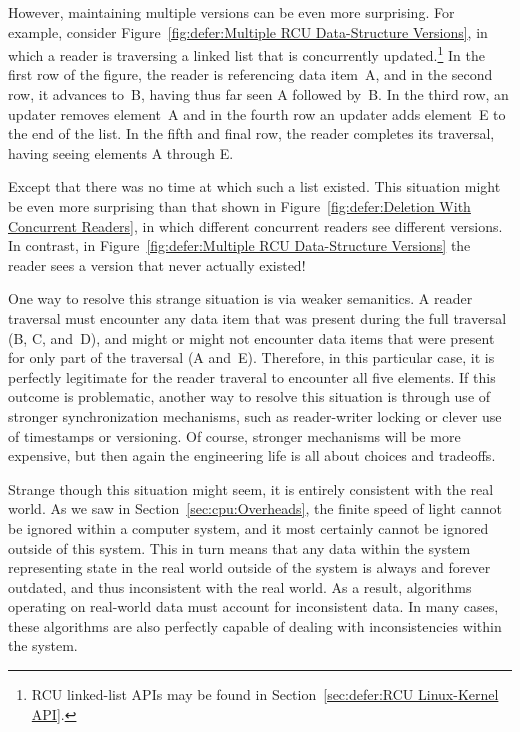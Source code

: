 However, maintaining multiple versions can be even more surprising.
For example, consider
Figure~\ref{fig:defer:Multiple RCU Data-Structure Versions},
in which a reader is traversing a linked list that is concurrently
updated.\footnote{
	RCU linked-list APIs may be found in
	Section~\ref{sec:defer:RCU Linux-Kernel API}.}
In the first row of the figure, the reader is referencing data item~A,
and in the second row, it advances to~B, having thus far seen A followed by~B.
In the third row, an updater removes element~A and in the fourth row
an updater adds element~E to the end of the list.
In the fifth and final row, the reader completes its traversal, having
seeing elements A through E.

Except that there was no time at which such a list existed.
This situation might be even more surprising than that shown in
Figure~\ref{fig:defer:Deletion With Concurrent Readers},
in which different concurrent readers see different versions.
In contrast, in
Figure~\ref{fig:defer:Multiple RCU Data-Structure Versions}
the reader sees a version that never actually existed!

One way to resolve this strange situation is via weaker semanitics.
A reader traversal must encounter any data item that was present
during the full traversal (B, C, and~D), and might or might not
encounter data items that were present for only part of the
traversal (A and~E).
Therefore, in this particular case, it is perfectly legitimate for
the reader traveral to encounter all five elements.
If this outcome is problematic, another way to resolve this situation is
through use of stronger synchronization mechanisms, such as reader-writer
locking or clever use of timestamps or versioning.
Of course, stronger mechanisms will be more expensive, but then again
the engineering life is all about choices and tradeoffs.

Strange though this situation might seem, it is entirely consistent with
the real world.
As we saw in
Section~\ref{sec:cpu:Overheads},
the finite speed of light cannot be ignored within a computer system,
and it most certainly cannot be ignored outside of this system.
This in turn means that any data within the system representing state
in the real world outside of the system is always and forever outdated,
and thus inconsistent with the real world.
As a result, algorithms operating on real-world data must account for
inconsistent data.
In many cases, these algorithms are also perfectly capable of dealing
with inconsistencies within the system.


